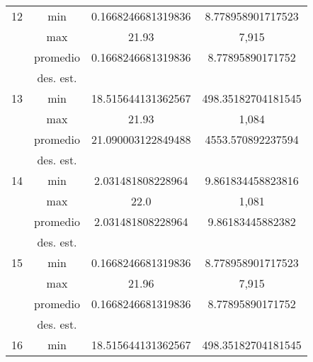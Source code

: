\documentclass{report}
\begin{document}
\begin{table}[ht]
\begin{tabular}{|c|c|c|c|}
        12                    & min                         &     0.1668246681319836       &   8.778958901717523     \\ \cline{2-4} 
                              & max                         &       21.93     &   7,915     \\ \cline{2-4} 
                              & promedio                    &      0.1668246681319836      &     8.77895890171752    \\ \cline{2-4} 
                              & des. est.                   &            &        \\ \hline
        13                    & min                         &       18.515644131362567     &   498.35182704181545     \\ \cline{2-4} 
                              & max                         &     21.93       &   1,084     \\ \cline{2-4} 
                              & promedio                    &    21.090003122849488        &    4553.570892237594    \\ \cline{2-4} 
                              & des. est.                   &            &        \\ \hline
        14                    & min                         &      2.031481808228964      &  9.861834458823816      \\ \cline{2-4} 
                              & max                         &     22.0       &    1,081    \\ \cline{2-4} 
                              & promedio                    &     2.031481808228964       &    9.86183445882382    \\ \cline{2-4} 
                              & des. est.                   &            &        \\ \hline
        15                    & min                         &     0.1668246681319836       &   8.778958901717523     \\ \cline{2-4} 
                              & max                         &      21.96      &    7,915    \\ \cline{2-4} 
                              & promedio                    &      0.1668246681319836      &   8.77895890171752     \\ \cline{2-4} 
                              & des. est.                   &            &        \\ \hline
        16                    & min                         &      18.515644131362567      &    498.35182704181545    \\ \cline{2-4} 

\end{tabular}
\end{table}
\end{document}
